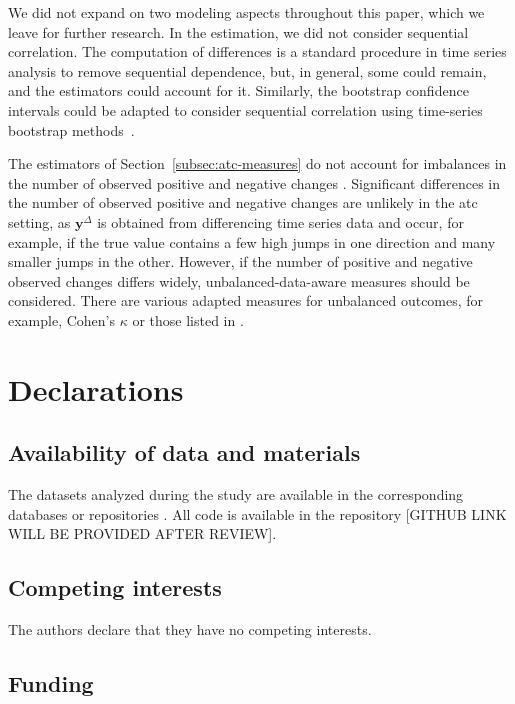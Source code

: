 \documentclass[pdflatex]{sn-jnl}
\theoremstyle{plain}%
\theoremstyle{definition}
\newcommand{\diffy}{\mathbf{y}^{\Delta}}
\begin{document}
We did not expand on two modeling aspects throughout this paper, which we leave for further research.
In the estimation, we did not consider sequential correlation.
The computation of differences is a standard procedure in time series analysis to remove sequential dependence, but, in general, some could remain, and the estimators could account for it.
Similarly, the bootstrap confidence intervals could be adapted to consider sequential correlation using time-series bootstrap methods~\citep{Hardle2003, Kreiss2012}.

The estimators of Section~\ref{subsec:atc-measures} do not account for imbalances in the number of observed positive and negative changes \citep[for theoretical analysis, see][Chapter 3]{Jolliffe2012}.
Significant differences in the number of observed positive and negative changes are unlikely in the \ac{atc} setting, as $\diffy$ is obtained from differencing time series data and occur, for example, if the true value contains a few high jumps in one direction and many smaller jumps in the other.
However, if the number of positive and negative observed changes differs widely, unbalanced-data-aware measures should be considered.
There are various adapted measures for unbalanced outcomes, for example, Cohen's $\kappa$ \citep{Cohen1960} or those listed in \citet[Table 3.3]{Jolliffe2012}.

\section*{Declarations}
\subsection*{Availability of data and materials}

The datasets analyzed during the study are available in the corresponding databases or repositories \parencite{ChairOfEconometricsAndStatisticsAtKarlsruheInstituteOfTechnology2024, Rostami-Tabar2023, Moody2017}.
All code is available in the repository [GITHUB LINK WILL BE PROVIDED AFTER REVIEW].


\subsection*{Competing interests}
The authors declare that they have no competing interests.

\subsection*{Funding}
\end{document}
